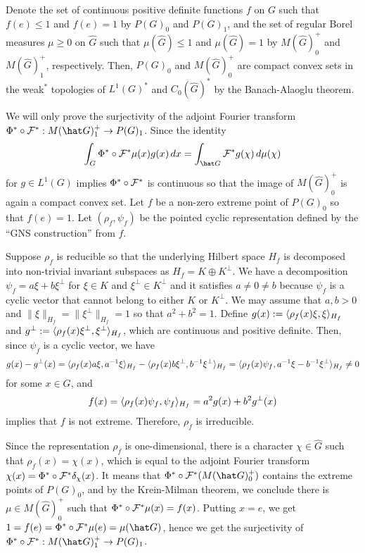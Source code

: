 \documentclass[a4paper]{article}
\begin{document}
\begin{pf}
Denote the set of continuous positive definite functions $f$ on $G$ such that $f(e)\le1$ and $f(e)=1$ by $P(G)_0$ and $P(G)_1$, and the set of regular Borel measures $\mu\ge0$ on $\hat G$ such that $\mu(\hat G)\le1$ and $\mu(\hat G)=1$ by $M(\hat G)_0^+$ and $M(\hat G)_1^+$, respectively.
Then, $P(G)_0$ and $M(\hat G)_0^+$ are compact convex sets in the weak$^*$ topologies of $L^1(G)^*$ and $C_0(\hat G)^*$ by the Banach-Alaoglu theorem.

We will only prove the surjectivity of the adjoint Fourier transform $\Phi^*\circ\cF^*:M(\hat G)_1^+\to P(G)_1$.
Since the identity
\[\int_G\Phi^*\circ\cF^*\mu(x)g(x)\,dx=\int_{\hat G}\cF^*g(\chi)\,d\mu(\chi)\]
for $g\in L^1(G)$ implies $\Phi^*\circ\mathcal{F}^*$ is continuous so that the image of $M(\hat G)_0^+$ is again a compact convex set.
Let $f$ be a non-zero extreme point of $P(G)_0$ so that $f(e)=1$.
Let $(\rho_f,\psi_f)$ be the pointed cyclic representation defined by the ``GNS construction'' from $f$.

Suppose $\rho_f$ is reducible so that the underlying Hilbert space $H_f$ is decomposed into non-trivial invariant subspaces as $H_f=K\oplus K^\perp$.
We have a decomposition $\psi_f=a\xi+b\xi^\perp$ for $\xi\in K$ and $\xi^\perp\in K^\perp$ and it satisfies $a\ne0\ne b$ because $\psi_f$ is a cyclic vector that cannot belong to either $K$ or $K^\perp$.
We may assume that $a,b>0$ and $\|\xi\|_{H_f}=\|\xi^\perp\|_{H_f}=1$ so that $a^2+b^2=1$.
Define $g(x):=\langle\rho_f(x)\xi,\xi\rangle_{H_f}$ and $g^\perp:=\langle\rho_f(x)\xi^\perp,\xi^\perp\rangle_{H_f}$, which are continuous and positive definite.
Then, since $\psi_f$ is a cyclic vector, we have
\[g(x)-g^\perp(x)=\langle\rho_f(x)a\xi,a^{-1}\xi\rangle_{H_f}-\langle\rho_f(x)b\xi^\perp,b^{-1}\xi^\perp\rangle_{H_f}=\langle\rho_f(x)\psi_f,a^{-1}\xi-b^{-1}\xi^\perp\rangle_{H_f}\ne0\]
for some $x\in G$, and
\[f(x)=\langle\rho_f(x)\psi_f,\psi_f\rangle_{H_f}=a^2g(x)+b^2g^\perp(x)\]
implies that $f$ is not extreme.
Therefore, $\rho_f$ is irreducible.

Since the representation $\rho_f$ is one-dimensional, there is a character $\chi\in\hat G$ such that $\rho_f(x)=\chi(x)$, which is equal to the adjoint Fourier transform $\chi(x)=\Phi^*\circ\mathcal{F}^*\delta_\chi(x)$.
It means that $\Phi^*\circ\cF^*(M(\hat G)_0^+)$ contains the extreme points of $P(G)_0$, and by the Krein-Milman theorem, we conclude there is $\mu\in M(\hat G)_0^+$ such that $\Phi^*\circ\mathcal{F}^*\mu(x)=f(x)$.
Putting $x=e$, we get $1=f(e)=\Phi^*\circ\cF^*\mu(e)=\mu(\hat G)$, hence we get the surjectivity of $\Phi^*\circ\cF^*:M(\hat G)_1^+\to P(G)_1$.
\end{pf}
\end{document}
